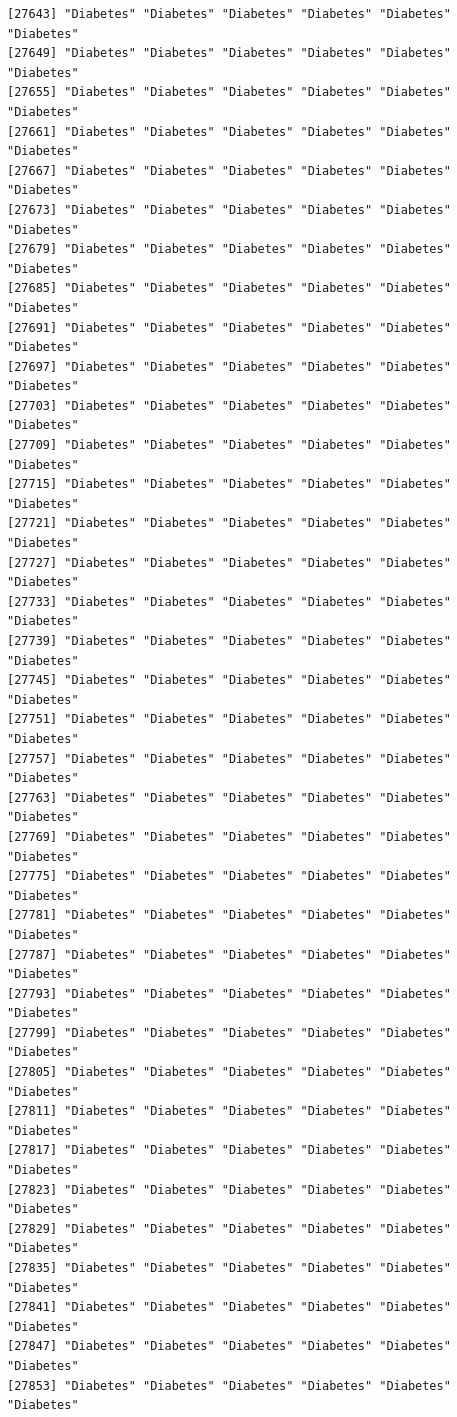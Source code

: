 \documentclass[
  letterpaper,
  DIV=11,
  numbers=noendperiod]{scrartcl}
\begin{document}
\begin{verbatim}
[27643] "Diabetes" "Diabetes" "Diabetes" "Diabetes" "Diabetes" "Diabetes"
[27649] "Diabetes" "Diabetes" "Diabetes" "Diabetes" "Diabetes" "Diabetes"
[27655] "Diabetes" "Diabetes" "Diabetes" "Diabetes" "Diabetes" "Diabetes"
[27661] "Diabetes" "Diabetes" "Diabetes" "Diabetes" "Diabetes" "Diabetes"
[27667] "Diabetes" "Diabetes" "Diabetes" "Diabetes" "Diabetes" "Diabetes"
[27673] "Diabetes" "Diabetes" "Diabetes" "Diabetes" "Diabetes" "Diabetes"
[27679] "Diabetes" "Diabetes" "Diabetes" "Diabetes" "Diabetes" "Diabetes"
[27685] "Diabetes" "Diabetes" "Diabetes" "Diabetes" "Diabetes" "Diabetes"
[27691] "Diabetes" "Diabetes" "Diabetes" "Diabetes" "Diabetes" "Diabetes"
[27697] "Diabetes" "Diabetes" "Diabetes" "Diabetes" "Diabetes" "Diabetes"
[27703] "Diabetes" "Diabetes" "Diabetes" "Diabetes" "Diabetes" "Diabetes"
[27709] "Diabetes" "Diabetes" "Diabetes" "Diabetes" "Diabetes" "Diabetes"
[27715] "Diabetes" "Diabetes" "Diabetes" "Diabetes" "Diabetes" "Diabetes"
[27721] "Diabetes" "Diabetes" "Diabetes" "Diabetes" "Diabetes" "Diabetes"
[27727] "Diabetes" "Diabetes" "Diabetes" "Diabetes" "Diabetes" "Diabetes"
[27733] "Diabetes" "Diabetes" "Diabetes" "Diabetes" "Diabetes" "Diabetes"
[27739] "Diabetes" "Diabetes" "Diabetes" "Diabetes" "Diabetes" "Diabetes"
[27745] "Diabetes" "Diabetes" "Diabetes" "Diabetes" "Diabetes" "Diabetes"
[27751] "Diabetes" "Diabetes" "Diabetes" "Diabetes" "Diabetes" "Diabetes"
[27757] "Diabetes" "Diabetes" "Diabetes" "Diabetes" "Diabetes" "Diabetes"
[27763] "Diabetes" "Diabetes" "Diabetes" "Diabetes" "Diabetes" "Diabetes"
[27769] "Diabetes" "Diabetes" "Diabetes" "Diabetes" "Diabetes" "Diabetes"
[27775] "Diabetes" "Diabetes" "Diabetes" "Diabetes" "Diabetes" "Diabetes"
[27781] "Diabetes" "Diabetes" "Diabetes" "Diabetes" "Diabetes" "Diabetes"
[27787] "Diabetes" "Diabetes" "Diabetes" "Diabetes" "Diabetes" "Diabetes"
[27793] "Diabetes" "Diabetes" "Diabetes" "Diabetes" "Diabetes" "Diabetes"
[27799] "Diabetes" "Diabetes" "Diabetes" "Diabetes" "Diabetes" "Diabetes"
[27805] "Diabetes" "Diabetes" "Diabetes" "Diabetes" "Diabetes" "Diabetes"
[27811] "Diabetes" "Diabetes" "Diabetes" "Diabetes" "Diabetes" "Diabetes"
[27817] "Diabetes" "Diabetes" "Diabetes" "Diabetes" "Diabetes" "Diabetes"
[27823] "Diabetes" "Diabetes" "Diabetes" "Diabetes" "Diabetes" "Diabetes"
[27829] "Diabetes" "Diabetes" "Diabetes" "Diabetes" "Diabetes" "Diabetes"
[27835] "Diabetes" "Diabetes" "Diabetes" "Diabetes" "Diabetes" "Diabetes"
[27841] "Diabetes" "Diabetes" "Diabetes" "Diabetes" "Diabetes" "Diabetes"
[27847] "Diabetes" "Diabetes" "Diabetes" "Diabetes" "Diabetes" "Diabetes"
[27853] "Diabetes" "Diabetes" "Diabetes" "Diabetes" "Diabetes" "Diabetes"

\end{verbatim}
\end{document}
